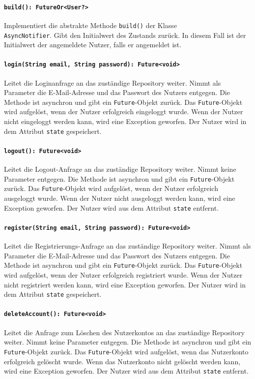 \documentclass{entwurfsheft}
\begin{document}
\begin{sloppypar}
\paragraph{\texttt{build(): FutureOr<User?>}}
Implementiert die abstrakte Methode \texttt{build()} der Klasse \\ \texttt{Async\-Notifier}. Gibt den Initialwert des Zustands zurück. In diesem Fall ist der Initialwert der angemeldete Nutzer, falls er angemeldet ist.
\paragraph{\texttt{login(String email, String password): Future<void>}}
Leitet die Loginanfrage an das zuständige Repository weiter. Nimmt als Parameter die E-Mail-Adresse und das Passwort des Nutzers entgegen. Die Methode ist asynchron und gibt ein \texttt{Future}-Objekt zurück. Das \texttt{Future}-Objekt wird aufgelöst, wenn der Nutzer erfolgreich eingeloggt wurde. Wenn der Nutzer nicht eingeloggt werden kann, wird eine Exception geworfen. Der Nutzer wird in dem Attribut \texttt{state} gespeichert.
\paragraph{\texttt{logout(): Future<void>}}
Leitet die Logout-Anfrage an das zuständige Repository weiter. Nimmt keine Parameter entgegen. Die Methode ist asynchron und gibt ein \texttt{Future}-Objekt zurück. Das \texttt{Future}-Objekt wird aufgelöst, wenn der Nutzer erfolgreich ausgeloggt wurde. Wenn der Nutzer nicht ausgeloggt werden kann, wird eine Exception geworfen. Der Nutzer wird aus dem Attribut \texttt{state} entfernt.
\paragraph{\texttt{register(String email, String password): Future<void>}}
Leitet die Registrierungs-An\-frage an das zuständige Repository weiter. Nimmt als Parameter die E-Mail-Adresse und das Passwort des Nutzers entgegen. Die Methode ist asynchron und gibt ein \texttt{Future}-Objekt zurück. Das \texttt{Future}-Objekt wird aufgelöst, wenn der Nutzer erfolgreich registriert wurde. Wenn der Nutzer nicht registriert werden kann, wird eine Exception geworfen. Der Nutzer wird in dem Attribut \texttt{state} gespeichert.
\paragraph{\texttt{deleteAccount(): Future<void>}}
Leitet die Anfrage zum Löschen des Nutzerkontos an das zuständige Repository weiter. Nimmt keine Parameter entgegen. Die Methode ist asynchron und gibt ein \texttt{Future}-Objekt zurück. Das \texttt{Future}-Objekt wird aufgelöst, wenn das Nutzerkonto erfolgreich gelöscht wurde. Wenn das Nutzerkonto nicht gelöscht werden kann, wird eine Exception geworfen. Der Nutzer wird aus dem Attribut \texttt{state} entfernt.

\end{sloppypar}
\end{document}
